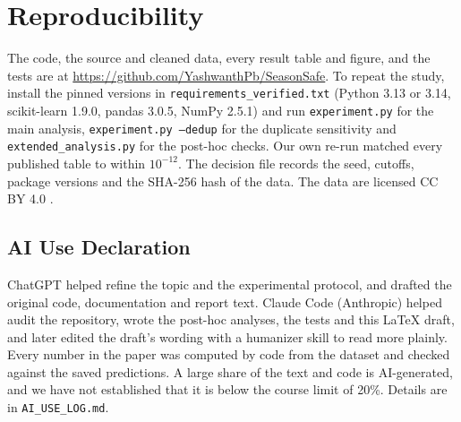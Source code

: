 \documentclass[conference]{IEEEtran}
\begin{document}
\section{Reproducibility}
The code, the source and cleaned data, every result table and figure, and the tests are at
\url{https://github.com/YashwanthPb/SeasonSafe}. To repeat the study, install the pinned versions in
\texttt{requirements\_verified.txt} (Python 3.13 or 3.14, scikit-learn 1.9.0, pandas 3.0.5, NumPy 2.5.1)
and run \texttt{experiment.py} for the main analysis, \texttt{experiment.py --dedup} for the duplicate
sensitivity and \texttt{extended\_analysis.py} for the post-hoc checks. Our own re-run matched every
published table to within $10^{-12}$. The decision file records the seed, cutoffs, package versions and
the SHA-256 hash of the data. The data are licensed CC BY 4.0 \cite{b1}.

\subsection{AI Use Declaration}
ChatGPT helped refine the topic and the experimental protocol, and drafted the original code,
documentation and report text. Claude Code (Anthropic) helped audit the repository, wrote the post-hoc
analyses, the tests and this LaTeX draft, and later edited the draft's wording with a humanizer skill to
read more plainly. Every number in the paper was computed by code from the dataset and checked against
the saved predictions. A large share of the text and code is AI-generated, and we have not established
that it is below the course limit of 20\%. Details are in \texttt{AI\_USE\_LOG.md}.
\end{document}

